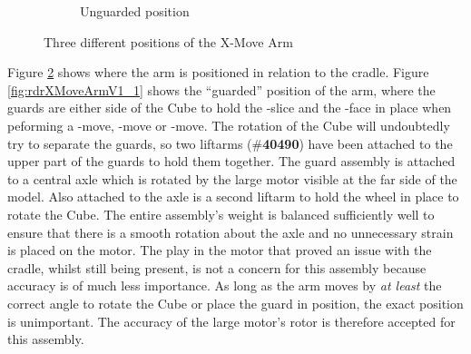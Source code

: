 \documentclass{report}
\newcommand{\tbo}[1]{\textbf{#1}}
\newcommand{\tit}[1]{\textit{#1}}
\newcommand{\legopiece}[1]{(\#\tbo{#1})}
\newcommand{\face}[1]{\uppercase{\texttt{\formatmovesnospace{#1}}}-face}
\newcommand{\move}[1]{\uppercase{\texttt{\formatmovesnospace{#1}}}-move}
\newcommand{\slice}[1]{\uppercase{\texttt{\formatmovesnospace{#1}}}-slice}
\begin{document}
\begin{figure}[H]
\begin{subfigure}[b]{0.31623\textwidth}
			\caption{Unguarded position}
			\label{fig:rdrXMoveArmV1_3}
		\end{subfigure}
		\caption{Three different positions of the X-Move Arm}
		\label{fig:rdrXMoveArmV1}
	\end{figure}
	
	Figure \ref{fig:rdrXMoveArmV1} shows where the arm is positioned in relation to the cradle. Figure \ref{fig:rdrXMoveArmV1_1} shows the \enquote{guarded} position of the arm, where the guards are either side of the Cube to hold the \slice{l-r} and the \face{U} in place when peforming a \move{D}, \move{D'} or \move{D2}. The rotation of the Cube will undoubtedly try to separate the guards, so two liftarms \legopiece{40490} have been attached to the upper part of the guards to hold them together. The guard assembly is attached to a central axle which is rotated by the large motor visible at the far side of the model. Also attached to the axle is a second liftarm to hold the wheel in place to rotate the Cube. The entire assembly's weight is balanced sufficiently well to ensure that there is a smooth rotation about the axle and no unnecessary strain is placed on the motor. The play in the motor that proved an issue with the cradle, whilst still being present, is not a concern for this assembly because accuracy is of much less importance. As long as the arm moves by \tit{at least} the correct angle to rotate the Cube or place the guard in position, the exact position is unimportant. The accuracy of the large motor's rotor is therefore accepted for this assembly.
	
\end{document}
